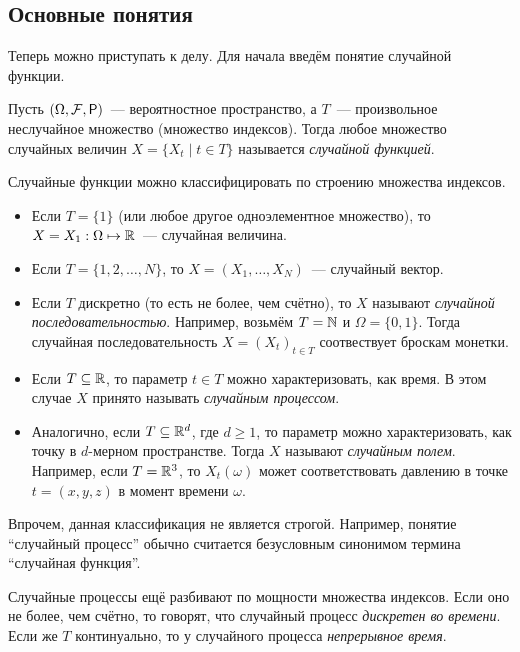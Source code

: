 \subsection{Основные понятия}
Теперь можно приступать к делу. Для начала введём понятие случайной функции.
\begin{definition}
	Пусть \((\Omega, \F, \Pr)\)~--- вероятностное пространство, а \(T\)~--- 
	произвольное неслучайное множество (множество индексов). Тогда любое 
	множество случайных величин \(X = \{X_{t} \mid t \in T\}\) называется 
	\emph{случайной функцией}.
\end{definition}
Случайные функции можно классифицировать по строению множества индексов.
\begin{itemize}
	\item Если \(T = \{1\}\) (или любое другое одноэлементное множество), то 
	\(X = X_{1} : \Omega \mapsto \mathbb{R}\)~--- случайная величина.
	\item Если \(T = \{1, 2, \ldots, N\}\), то \(X = (X_{1}, \ldots, 
	X_{N})\)~--- случайный вектор.
	\item Если \(T\) дискретно (то есть не более, чем счётно), то \(X\) 
	называют \emph{случайной последовательностью}. Например, возьмём \(T = \mathbb{N}\) 
	и \(\Omega = \{0, 1\}\). Тогда случайная последовательность \(X = (X_t)_{t 
	\in T}\) соотвествует броскам монетки.
	\item Если \(T \subseteq \mathbb{R}\), то параметр \(t \in T\) можно 
	характеризовать, как время. В этом случае \(X\) принято называть 
	\emph{случайным процессом}.
	\item Аналогично, если \(T \subseteq \mathbb{R}^{d}\), где \(d \geq 1\), то 
	параметр можно характеризовать, как точку в \(d\)-мерном пространстве. 
	Тогда \(X\) называют \emph{случайным полем}. Например, если \(T = \mathbb{R}^{3}\), 
	то \(X_{t}(\omega)\) может соответствовать давлению в точке \(t = (x, y, 
	z)\) в момент времени \(\omega\).
\end{itemize}

Впрочем, данная классификация не является строгой. Например, понятие 
``случайный процесс'' обычно считается безусловным синонимом термина 
``случайная функция''.

Случайные процессы ещё разбивают по мощности множества индексов. Если оно не 
более, чем счётно, то говорят, что случайный процесс \emph{дискретен во 
времени}. Если же \(T\) континуально, то у случайного процесса 
\emph{непрерывное время}.

